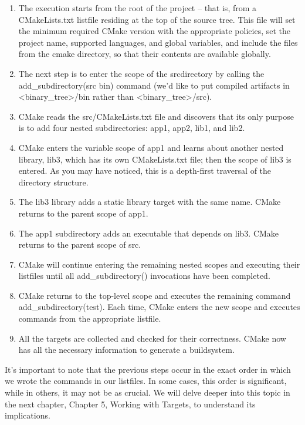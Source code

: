 \begin{enumerate}
\item
The execution starts from the root of the project – that is, from a CMakeLists.txt listfile residing at the top of the source tree. This file will set the minimum required CMake version with the appropriate policies, set the project name, supported languages, and global variables, and include the files from the cmake directory, so that their contents are available globally.

\item
The next step is to enter the scope of the srcdirectory by calling the add\_subdirectory(src bin) command (we’d like to put compiled artifacts in <binary\_tree>/bin rather than <binary\_tree>/src).

\item
CMake reads the src/CMakeLists.txt file and discovers that its only purpose is to add four nested subdirectories: app1, app2, lib1, and lib2.

\item
CMake enters the variable scope of app1 and learns about another nested library, lib3, which has its own CMakeLists.txt file; then the scope of lib3 is entered. As you may have noticed, this is a depth-first traversal of the directory structure.

\item
The lib3 library adds a static library target with the same name. CMake returns to the parent scope of app1.

\item
The app1 subdirectory adds an executable that depends on lib3. CMake returns to the parent scope of src.

\item
CMake will continue entering the remaining nested scopes and executing their listfiles until all add\_subdirectory() invocations have been completed.

\item
CMake returns to the top-level scope and executes the remaining command add\_subdirectory(test). Each time, CMake enters the new scope and executes commands from the appropriate listfile.

\item
All the targets are collected and checked for their correctness. CMake now has all the necessary information to generate a buildsystem.
\end{enumerate}

It’s important to note that the previous steps occur in the exact order in which we wrote the commands in our listfiles. In some cases, this order is significant, while in others, it may not be as crucial. We will delve deeper into this topic in the next chapter, Chapter 5, Working with Targets, to understand its implications.

